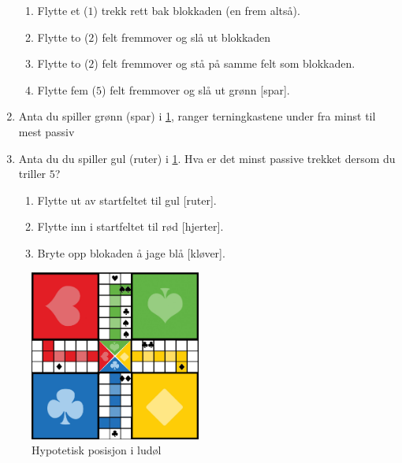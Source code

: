 \documentclass[10pt,a4paper,norsk,openany]{book}
\begin{document}
\begin{enumerate}
\begin{enumerate}
      \item Flytte et ($1$) trekk rett bak blokkaden (en frem altså).
      \item Flytte to ($2$) felt fremmover og slå ut blokkaden
      \item Flytte to ($2$) felt fremmover og stå på samme felt som blokkaden.
      \item Flytte fem
        ($5$) felt fremmover og slå ut grønn [spar].
    \end{enumerate}
  \item Anta du spiller grønn (spar) i \cref{fig:ludolbrett-1}, ranger
    terningkastene under fra minst til mest passiv
      \item Anta du du spiller gul (ruter) i \cref{fig:ludolbrett-1}. Hva er det
    minst passive trekket dersom du triller $5$?
    \begin{enumerate}
      \item Flytte ut av startfeltet til gul [ruter].
      \item Flytte inn i startfeltet til rød [hjerter].
      \item Bryte opp blokaden å jage blå [kløver].
    \end{enumerate}
\end{enumerate}

\begin{figure}[htbp!]
  \centering
  \includegraphics[width=0.5\textwidth]{ludobrett-2}
  \caption{Hypotetisk posisjon i ludøl}
  \label{fig:ludolbrett-1}
\end{figure}

\newpage
\end{document}
